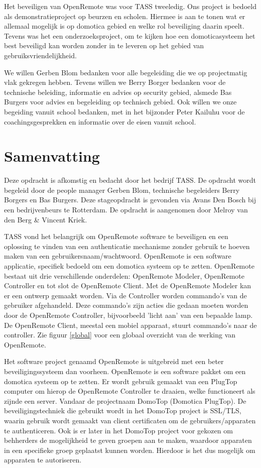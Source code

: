 \documentclass[]{article}
\begin{document}
Het beveiligen van OpenRemote was voor TASS tweeledig. Ons project is bedoeld als
demonstratieproject op beurzen en scholen. Hiermee is aan te tonen wat er
allemaal mogelijk is op domotica gebied en welke rol beveiliging daarin speelt.
Tevens was het een onderzoeksproject, om te kijken hoe een domoticasysteem
het best beveiligd kan worden zonder in te leveren op het gebied van
gebruiksvriendelijkheid.

We willen Gerben Blom bedanken voor alle begeleiding die we op projectmatig vlak
gekregen hebben. Tevens willen we Berry Borger bedanken voor de technische
beleiding, informatie en advies op security gebied, alsmede Bas Burgers voor advies en begeleiding op technisch gebied. Ook willen we onze
begeiding vanuit school bedanken, met in het bijzonder Peter Kailuhu voor
de coachingsgesprekken en informatie over de eisen vanuit school.

\newpage
\thispagestyle{empty}
\section*{Samenvatting}
Deze opdracht is afkomstig en bedacht door het bedrijf TASS. De opdracht wordt
begeleid door de people manager Gerben Blom, technische begeleiders Berry
Borgers en Bas Burgers. Deze stageopdracht is gevonden via Avans Den
Bosch bij een bedrijvenbeurs te Rotterdam. De opdracht is aangenomen door
Melroy van den Berg \& Vincent Kriek.

TASS vond het belangrijk om OpenRemote software te beveiligen en een oplossing
te vinden van een authenticatie mechanisme zonder gebruik te hoeven maken van
een gebruikersnaam/wachtwoord. OpenRemote is een software
applicatie, specifiek bedoeld om een domotica systeem op te zetten. OpenRemote
bestaat uit drie verschillende onderdelen: OpenRemote Modeler, OpenRemote
Controller en tot slot de OpenRemote Client. Met de OpenRemote Modeler kan er een ontwerp
gemaakt worden. Via de Controller worden commando's van de gebruiker
afgehandeld. Deze commando's zijn acties die gedaan moeten worden door de
OpenRemote Controller, bijvoorbeeld 'licht aan' van een bepaalde lamp. De OpenRemote Client, meestal een mobiel apparaat, stuurt
commando's naar de controller. Zie figuur \ref{global} voor een globaal overzicht van de
werking van OpenRemote.

Het software project genaamd OpenRemote is uitgebreid met een beter
beveiligingssysteem dan voorheen. OpenRemote is een software
pakket om een domotica systeem op te zetten. Er wordt gebruik gemaakt van
een PlugTop computer om hierop de OpenRemote Controller te draaien, welke functioneert als
zijnde een server. Vandaar de projectnaam DomoTop (Domotica PlugTop).
De beveiligingstechniek die gebruikt wordt in het DomoTop project is SSL/TLS,
waarin gebruik wordt gemaakt van client certificaten om de
gebruikers/apparaten te authenticeren. Ook is er later in het DomoTop project
voor gekozen om behherders de mogelijkheid te geven groepen aan te maken, waardoor
apparaten in een specifieke groep geplaatst kunnen worden. Hierdoor
is het dus mogelijk om apparaten te autoriseren.
\end{document}
